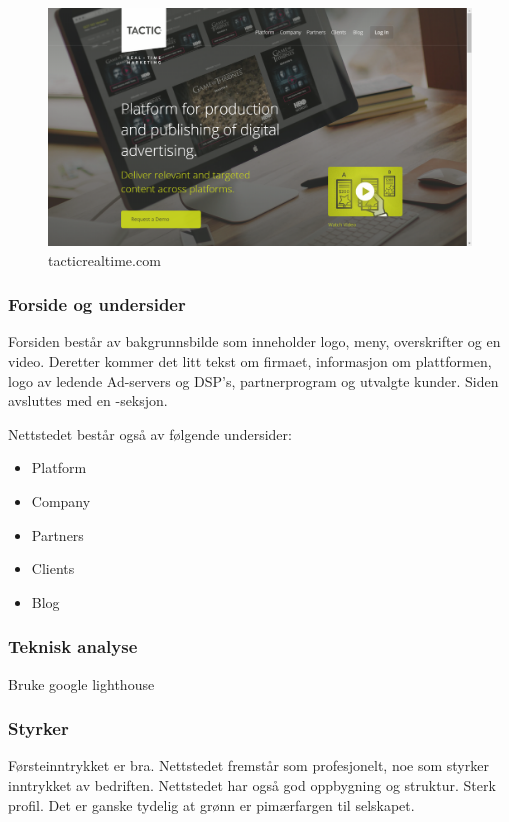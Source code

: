 \begin{figure}[H]
    \centering
    \includegraphics[width=\textwidth]{line/tacticrealtime_com_(1366x768).png}
    \caption{tacticrealtime.com}
    \label{fig:competitors-tacticrealtime.com}
\end{figure}

\subsubsection{Forside og undersider}

Forsiden består av bakgrunnsbilde som inneholder logo, meny, overskrifter og en video.  
Deretter kommer det litt tekst om firmaet, informasjon om plattformen, logo av ledende  Ad-servers og DSP's, partnerprogram og utvalgte kunder. Siden avsluttes med en -seksjon.

Nettstedet består også av følgende undersider:
\begin{itemize}
\item Platform
\item Company
\item Partners
\item Clients
\item Blog
\end{itemize}

\subsubsection{Teknisk analyse}
Bruke google lighthouse

\subsubsection{Styrker}
Førsteinntrykket er bra. Nettstedet fremstår som profesjonelt, noe som styrker inntrykket av bedriften. Nettstedet har også god oppbygning og struktur. 
Sterk profil. Det er ganske tydelig at grønn er pimærfargen til selskapet.

